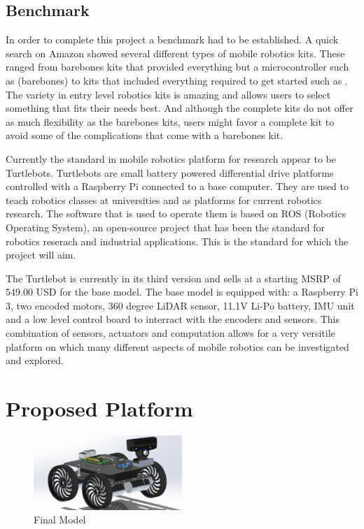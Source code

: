 \documentclass[12pt, letterpaper,titlepage]{article}
\begin{document}
\subsection{Benchmark}

	In order to complete this project a benchmark had to be established. A quick search on Amazon showed several different types of mobile robotics kits. These ranged from barebones kits that provided everything but a microcontroller such as (barebones) to kits that included everything required to get started such as \cite{complete1}. The variety in entry level robotics kits is amazing and allows users to select something that fits their needs best. And although the complete kits do not offer as much flexibility as the barebones kits, users might favor a complete kit to avoid some of the complications that come with a barebones kit. 

	Currently the standard in mobile robotics platform for research appear to be Turtlebots. Turtlebots are small battery powered differential drive platforms controlled with a Raspberry Pi connected to a base computer. They are used to teach robotics classes at universities and as platforms for current robotics research. The software that is used to operate them is based on ROS (Robotics Operating System), an open-source project that has been the standard for robotics reserach and industrial applications. This is the standard for which the project will aim.

	The Turtlebot is currently in its third version and sells at a starting MSRP of 549.00 USD for the base model. The base model is equipped with: a Raspberry Pi 3, two encoded motors, 360 degree LiDAR sensor, 11.1V Li-Po battery, IMU unit and a low level control board to interract with the encoders and sensors. This combination of sensors, actuators and computation allows for a very versitile platform on which many different aspects of mobile robotics can be investigated and explored.

\section{Proposed Platform}
	\begin{figure}[h]
		\includegraphics[width=0.5\textwidth]{final.png}
		\centering
		\caption{Final Model}
	\end{figure}
\end{document}

